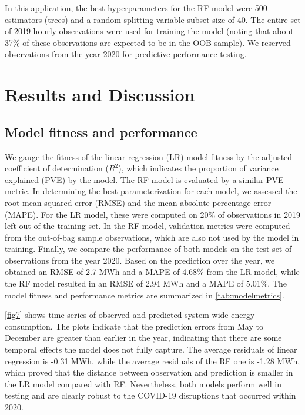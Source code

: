 \documentclass[times]{TRR}
\begin{document}
In this application, the best hyperparameters for the RF model were 500 estimators (trees) and a random splitting-variable subset size of 40.
The entire set of 2019 hourly observations were used for training the model (noting that about 37\% of these observations are expected to be in the OOB sample). 
We reserved observations from the year 2020 for predictive performance testing. 



\section{Results and Discussion}
\subsection{Model fitness and performance}
We gauge the fitness of the linear regression (LR) model fitness by the adjusted coefficient of determination ($R^2$), which indicates the proportion of variance explained (PVE) by the model. The RF model is evaluated by a similar PVE metric.
In determining the best parameterization for each model, we assessed the root mean squared error (RMSE) and the mean absolute percentage error (MAPE). For the LR model, these were computed on 20\% of observations in 2019 left out of the training set. In the RF model, validation metrics were computed from the out-of-bag sample observations, which are also not used by the model in training.
Finally, we compare the performance of both models on the test set of observations from the year 2020.
Based on the prediction over the year, we obtained an RMSE of 2.7 MWh and a MAPE of 4.68\% from the LR model, while the RF model resulted in an RMSE of 2.94 MWh and a MAPE of 5.01\%. 
The model fitness and performance metrics are summarized in \autoref{tab:modelmetrics}.

\autoref{fig7} shows time series of observed and predicted system-wide energy consumption. The plots indicate that the prediction errors from May to December are greater than earlier in the year, indicating that there are some temporal effects the model does not fully capture. The average residuals of linear regression is -0.31 MWh, while the average residuals of the RF one is -1.28 MWh, which proved that the distance between observation and prediction is smaller in the LR model compared with RF. Nevertheless, both models perform well in testing and are clearly robust to the COVID-19 disruptions that occurred within 2020. 
\end{document}
